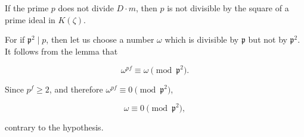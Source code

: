 If the prime $p$ does not divide $D \cdot m$, then $p$ is not divisible by the square of a prime ideal in $K(\zeta)$.

For if $\mathfrak{p}^2 \mid p$, then let us choose a number $\omega$ which is divisible by $\mathfrak{p}$ but not by $\mathfrak{p}^2$. It follows from the lemma that

$$\omega^{pf} \equiv \omega \pmod{\mathfrak{p}^2}.$$

Since $p^f \geq 2$, and therefore $\omega^{pf} \equiv 0 \pmod{\mathfrak{p}^2}$,

$$\omega \equiv 0 \pmod{\mathfrak{p}^2},$$

contrary to the hypothesis.
